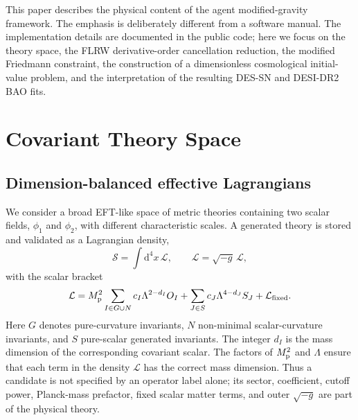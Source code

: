 \documentclass[aps,prd,twocolumn,superscriptaddress,nofootinbib,longbibliography]{revtex4-2}
\newcommand{\dd}{\mathrm{d}}
\newcommand{\Lag}{\mathcal{L}}
\newcommand{\calS}{\mathcal{S}}
\newcommand{\Mp}{M_{\rm p}}
\newcommand{\Lam}{\Lambda}
\begin{document}
This paper describes the physical content of the agent modified-gravity framework. The emphasis is deliberately different from a software manual.  The implementation details are documented in the public code; here we focus on the theory space, the FLRW derivative-order cancellation reduction, the modified Friedmann constraint, the construction of a dimensionless cosmological initial-value problem, and the interpretation of the resulting DES-SN and DESI-DR2 BAO fits.

\section{Covariant Theory Space}
\label{sec:theory-space}

\subsection{Dimension-balanced effective Lagrangians}
\label{subsec:dimension-balanced}

We consider a broad EFT-like space of metric theories containing two scalar fields, $\phi_1$ and $\phi_2$, with different characteristic scales.  A generated theory is stored and validated as a Lagrangian density,
\begin{equation}
\calS=\int \dd^4x\,\mathscr{L},
\qquad
\mathscr{L}=\sqrt{-g}\,\Lag ,
\label{eq:action}
\end{equation}
with the scalar bracket
\begin{equation}
\Lag=
\Mp^2\sum_{I\in G\cup N}
c_I\Lam^{2-d_I}O_I
+
\sum_{J\in S}c_J\Lam^{4-d_J}S_J
+
\Lag_{\rm fixed}.
\label{eq:lagrangian}
\end{equation}
Here $G$ denotes pure-curvature invariants, $N$ non-minimal scalar-curvature invariants, and $S$ pure-scalar generated invariants.  The integer $d_I$ is the mass dimension of the corresponding covariant scalar.  The factors of $\Mp^2$ and $\Lam$ ensure that each term in the density $\mathscr{L}$ has the correct mass dimension.  Thus a candidate is not specified by an operator label alone; its sector, coefficient, cutoff power, Planck-mass prefactor, fixed scalar matter terms, and outer $\sqrt{-g}$ are part of the physical theory.
\end{document}
